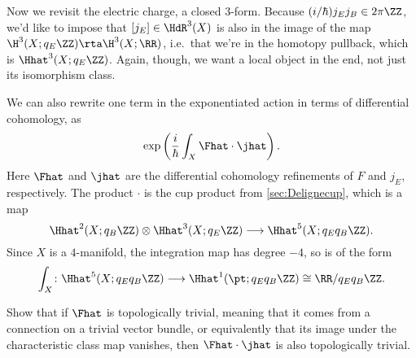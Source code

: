 Now we revisit the electric charge, a closed $3$-form.
Because
$(i/\hbar)j_Ej_B\in 2\pi\ZZ$, we'd like to impose that $[j_E]\in \HdR^3(X)$ is also in the image of the map
$\H^3(X;q_E\ZZ)\rta \H^3(X;\RR)$, i.e.\ that we're in the homotopy pullback, which is $\Hhat^3(X;q_E\ZZ)$. Again,
though, we want a local object in the end, not just its isomorphism class.

We can also rewrite one term in the exponentiated action in terms of differential cohomology, as
\begin{equation}
	\exp\left(\frac i\hbar \int_X \Fhat\cdot\jhat\right).
\end{equation}
Here $\Fhat$ and $\jhat$ are the differential cohomology refinements of $F$ and $j_E$, respectively.  The
product $\cdot$ is the cup product from \cref{sec:Delignecup}, which is a map
\begin{equation}\label{differential_action}
	\Hhat^2(X; q_B\ZZ)\otimes\Hhat^3(X;q_E\ZZ)\longrightarrow \Hhat^5(X; q_Eq_B\ZZ).
\end{equation}
Since $X$ is a $4$-manifold, the integration map has degree $-4$, so is of the form
\begin{equation}
	\int_X\colon \Hhat^5(X; q_Eq_B\ZZ)\longrightarrow \Hhat^1(\pt; q_Eq_B\ZZ)\cong \RR/q_Eq_B\ZZ.
\end{equation}

\begin{exercise}
	Show that if $\Fhat$ is topologically trivial, meaning that it comes from a connection on a trivial vector
	bundle, or equivalently that its image under the characteristic class map vanishes, then
	$\Fhat\cdot\jhat$ is also topologically trivial.
\end{exercise}

